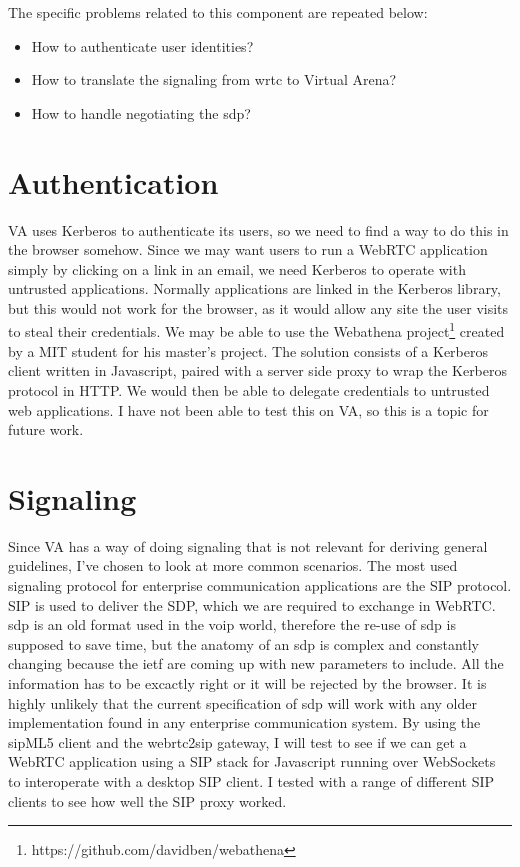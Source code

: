 The specific problems related to this component are repeated below:

\begin{itemize}
\item{How to authenticate user identities?}
\item{How to translate the signaling from \gls{wrtc} to Virtual Arena?}
\item{How to handle negotiating the \gls{sdp}?}
\end{itemize}

\section{Authentication}
VA uses Kerberos to authenticate its users, so we need to find a way to do this in the browser somehow. Since we may want users to run a WebRTC application simply by clicking on a link in an email, we need Kerberos to operate with untrusted applications. Normally applications are linked in the Kerberos library, but this would not work for the browser, as it would allow any site the user visits to steal their credentials\cite{webathena}. We may be able to use the Webathena project\footnote{https://github.com/davidben/webathena} created by a MIT student for his master's project\cite{webathena}. The solution consists of a Kerberos client written in Javascript, paired with a server side proxy to wrap the Kerberos protocol in HTTP. We would then be able to delegate credentials to untrusted web applications. I have not been able to test this on VA, so this is a topic for future work.

\section{Signaling}
Since VA has a way of doing signaling that is not relevant for deriving general guidelines, I've chosen to look at more common scenarios. The most used signaling protocol for enterprise communication applications are the SIP protocol. SIP is used to deliver the SDP, which we are required to exchange in WebRTC. \gls{sdp} is an old format used in the \gls{voip} world, therefore the re-use of \gls{sdp} is supposed to save time, but the anatomy of an \gls{sdp} is complex and constantly changing because the \gls{ietf} are coming up with new parameters to include. All the information has to be excactly right or it will be rejected by the browser. It is highly unlikely that the current specification of \gls{sdp} will work with any older implementation found in any enterprise communication system. By using the sipML5 client and the webrtc2sip gateway, I will test to see if we can get a WebRTC application using a SIP stack for Javascript running over WebSockets to interoperate with a desktop SIP client. I tested with a range of different SIP clients to see how well the SIP proxy worked.

